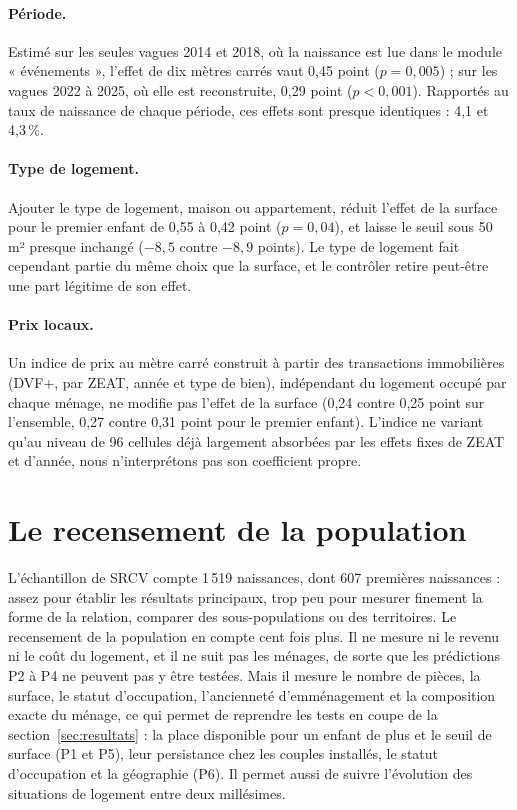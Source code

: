 \documentclass[11pt,a4paper]{article}
\theoremstyle{plain}
\theoremstyle{definition}
\theoremstyle{remark}
\begin{document}
\paragraph{Période.} Estimé sur les seules vagues 2014 et 2018, où la naissance est lue dans le module « événements », l'effet de dix mètres carrés vaut 0,45 point ($p = 0{,}005$) ; sur les vagues 2022 à 2025, où elle est reconstruite, 0,29 point ($p < 0{,}001$). Rapportés au taux de naissance de chaque période, ces effets sont presque identiques : 4,1 et 4,3\,\%.

\paragraph{Type de logement.} Ajouter le type de logement, maison ou appartement, réduit l'effet de la surface pour le premier enfant de 0,55 à 0,42 point ($p = 0{,}04$), et laisse le seuil sous 50 m² presque inchangé ($-8{,}5$ contre $-8{,}9$ points). Le type de logement fait cependant partie du même choix que la surface, et le contrôler retire peut-être une part légitime de son effet.

\paragraph{Prix locaux.} Un indice de prix au mètre carré construit à partir des transactions immobilières (DVF+, par ZEAT, année et type de bien), indépendant du logement occupé par chaque ménage, ne modifie pas l'effet de la surface (0,24 contre 0,25 point sur l'ensemble, 0,27 contre 0,31 point pour le premier enfant). L'indice ne variant qu'au niveau de 96 cellules déjà largement absorbées par les effets fixes de ZEAT et d'année, nous n'interprétons pas son coefficient propre.

\section{Le recensement de la population}\label{app:rp}

L'échantillon de SRCV compte 1\,519 naissances, dont 607 premières naissances : assez pour établir les résultats principaux, trop peu pour mesurer finement la forme de la relation, comparer des sous-populations ou des territoires. Le recensement de la population en compte cent fois plus. Il ne mesure ni le revenu ni le coût du logement, et il ne suit pas les ménages, de sorte que les prédictions P2 à P4 ne peuvent pas y être testées. Mais il mesure le nombre de pièces, la surface, le statut d'occupation, l'ancienneté d'emménagement et la composition exacte du ménage, ce qui permet de reprendre les tests en coupe de la section~\ref{sec:resultats} : la place disponible pour un enfant de plus et le seuil de surface (P1 et P5), leur persistance chez les couples installés, le statut d'occupation et la géographie (P6). Il permet aussi de suivre l'évolution des situations de logement entre deux millésimes.
\end{document}
